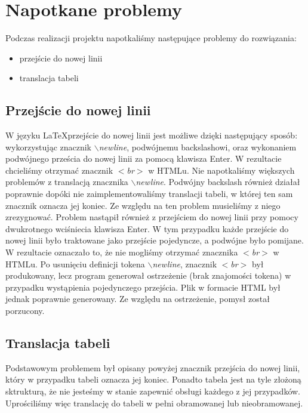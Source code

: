 \chapter{Napotkane problemy}


Podczas realizacji projektu napotkaliśmy następujące problemy do rozwiązania:
    \begin{itemize}
        \item przejście do nowej linii
        \item translacja tabeli
    \end{itemize}

\section{Przejście do nowej linii}

W języku \LaTeX \space przejście do nowej linii jest możliwe dzięki następujący sposób: wykorzystując znacznik \textit{$\backslash$newline}, podwójnemu backslashowi, 
oraz wykonaniem podwójnego prześcia do nowej linii za pomocą klawisza Enter. W rezultacie chcieliśmy otrzymać znacznik \textit{$<$br$>$} w HTMLu. 
Nie napotkaliśmy większych problemów z translacją znacznika \textit{$\backslash$newline}. Podwójny backslash również działał poprawnie dopóki nie 
zaimplementowaliśmy translacji tabeli, w której ten sam znacznik oznacza jej koniec. Ze względu na ten problem musieliśmy z niego 
zrezygnować. Problem nastąpił również z przejściem do nowej linii przy pomocy dwukrotnego wciśniecia klawisza Enter. W tym przypadku 
każde przejście do nowej linii było traktowane jako przejście pojedyncze, a podwójne było pomijane. W rezultacie oznaczało to, że nie 
mogliśmy otrzymać znacznika \textit{$<$br$>$} w HTMLu. Po usunięciu definicji tokena \textit{$\backslash$newline}, znacznik \textit{$<$br$>$} był 
produkowany, lecz program generował ostrzeżenie (brak znajomości tokena) w przypadku wystąpienia pojedynczego przejścia. 
Plik w formacie HTML był jednak poprawnie generowany. Ze względu na ostrzeżenie, pomysł został porzucony.

\section{Translacja tabeli}

Podstawowym problemem był opisany powyżej znacznik przejścia do nowej linii, który w przypadku tabeli oznacza jej koniec. Ponadto 
tabela jest na tyle złożoną sktrukturą, że nie jesteśmy w stanie zapewnić obsługi każdego z jej przypadków. Uprościliśmy więc translację 
do tabeli w pełni obramowanej lub nieobramowanej.